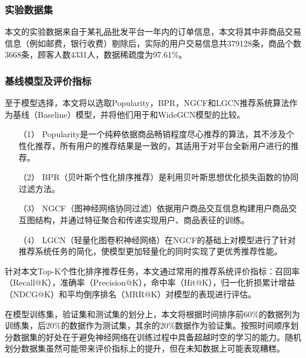 \documentclass[lang=cn,11pt,a4paper,cite=authoryear]{elegantpaper}
\begin{document}
\subsubsection{实验数据集}
本文的实验数据来自于某礼品批发平台一年内的订单信息，本文将其中非商品交易信息（例如邮费，银行收费）剔除后，实际的用户交易信息共379128条，商品个数3668条，顾客人数4331人，数据稀疏度为97.61\%。

\subsubsection{基线模型及评价指标}
至于模型选择，本文将以选取Popularity，BPR，NGCF和LGCN推荐系统算法作为基线（Baseline）模型，并将他们用于和WideGCN模型的比较。
\begin{itemize}
  \item [（1）]Popularity是一个纯粹依据商品畅销程度尽心推荐的算法，其不涉及个性化推荐，所有用户的推荐结果是一致的，其适用于对平台全新用户进行的推荐。
  \item [（2）]BPR（贝叶斯个性化排序推荐）是利用贝叶斯思想优化损失函数的协同过滤方法。
  \item [（3）]NGCF（图神经网络协同过滤）依据用户商品交互信息构建用户商品交互图结构，并通过特征聚合和传递实现用户、商品表征的训练。
  \item [（4）]LGCN（轻量化图卷积神经网络）在NGCF的基础上对模型进行了针对推荐系统任务的简化，使模型更加轻量化的同时实现了更优秀推荐性能。
\end{itemize}

针对本文Top-K个性化排序推荐任务，本文通过常用的推荐系统评价指标：召回率（Recall@K），准确率（Precision@K），命中率（Hit@K），归一化折损累计增益（NDCG@K）和平均倒序排名（MRR@K）对模型的表现进行评估。

在模型训练集，验证集和测试集的划分上，本文将根据时间排序前60\%的数据列为训练集，后20\%的数据作为测试集，其余的20\%数据作为验证集。按照时间顺序划分数据集的好处在于避免神经网络在训练过程中具备超越时空的学习的能力。随机划分数据集虽然可能带来评价指标上的提升，但在未知数据上可能表现糟糕。
\end{document}
